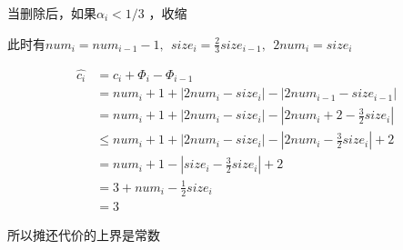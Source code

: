 \documentclass[UTF8]{ctexart}
\begin{document}
    当删除后，如果$\alpha _i < 1/3$ ，收缩

    此时有$num_i=num_{i-1}-1,~~size_{i}=\frac{2}{3}size_{i-1},~~2num_i=size_i$

    \begin{equation*}
        \begin{aligned}
            \hat{c_i}&=c_i+\Phi _i -\Phi _{i-1}\\
            &=num_i+1+|2num_i-size_i|-|2num_{i-1}-size_{i-1}|\\
            &=num_i+1+|2num_i-size_i|-|2num_i +2 -\frac{3}{2}size_i|\\
            &\le num_i+1+|2num_i-size_i|-|2num_i -\frac{3}{2}size_i|+2\\
            &=num_i+1-|size_i-\frac{3}{2}size_i|+2\\
            &=3+num_i-\frac{1}{2}size_i\\
            &=3
        \end{aligned}
    \end{equation*}

    所以摊还代价的上界是常数
\end{document}

